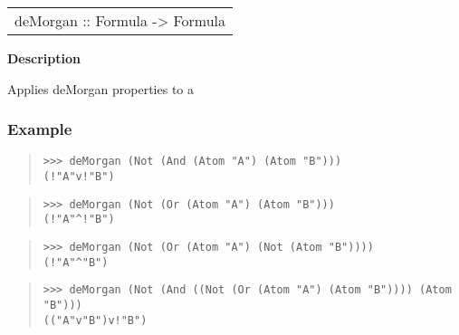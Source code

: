 \begin{haddockdesc}
\item[\begin{tabular}{@{}l}
deMorgan :: Formula -> Formula
\end{tabular}]
{\haddockbegindoc
\textbf{Description}\par
Applies deMorgan properties to a \par
\subsubsection*{\textbf{Example}}
\begin{quote}
{\haddockverb\begin{verbatim}
>>> deMorgan (Not (And (Atom "A") (Atom "B")))
(!"A"v!"B")

\end{verbatim}}
\end{quote}
\begin{quote}
{\haddockverb\begin{verbatim}
>>> deMorgan (Not (Or (Atom "A") (Atom "B")))
(!"A"^!"B")

\end{verbatim}}
\end{quote}
\begin{quote}
{\haddockverb\begin{verbatim}
>>> deMorgan (Not (Or (Atom "A") (Not (Atom "B"))))
(!"A"^"B")

\end{verbatim}}
\end{quote}
\begin{quote}
{\haddockverb\begin{verbatim}
>>> deMorgan (Not (And ((Not (Or (Atom "A") (Atom "B")))) (Atom "B")))
(("A"v"B")v!"B")

\end{verbatim}}
\end{quote}}
\end{haddockdesc}
